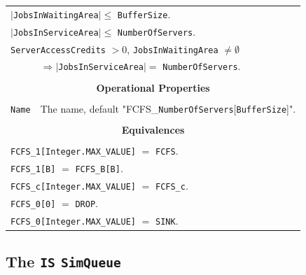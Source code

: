 \documentclass[12pt]{book}
\begin{document}
\begin{tabular}{|l|l|l|l|}
\multicolumn{4}{|l|}{$|$\lstinline|JobsInWaitingArea|$| \leq$ \lstinline|BufferSize|.} \\
\multicolumn{4}{|l|}{$|$\lstinline|JobsInServiceArea|$| \leq$ \lstinline|NumberOfServers|.} \\
\multicolumn{4}{|l|}{\lstinline|ServerAccessCredits| $> 0$, \lstinline|JobsInWaitingArea| $\neq \emptyset$} \\
    \multicolumn{1}{|l}{}
  & \multicolumn{3}{l|}{$\Rightarrow |$\lstinline|JobsInServiceArea|$| =$ \lstinline|NumberOfServers|.} \\
\hline
\multicolumn{4}{|c|}{} \\
\multicolumn{4}{|c|}{\bf Operational Properties} \\
\multicolumn{4}{|c|}{} \\
\hline
\lstinline|Name| & \multicolumn{3}{|l|}{The name, default "FCFS\_\lstinline{NumberOfServers}[\lstinline|BufferSize|]".} \\
\hline
\multicolumn{4}{|c|}{} \\
\multicolumn{4}{|c|}{\bf Equivalences} \\
\multicolumn{4}{|c|}{} \\
\hline
\multicolumn{4}{|l|}{\lstinline|FCFS_1[Integer.MAX_VALUE]| $=$ \lstinline|FCFS|.} \\
\multicolumn{4}{|l|}{\lstinline|FCFS_1[B]| $=$ \lstinline|FCFS_B[B]|.} \\
\multicolumn{4}{|l|}{\lstinline|FCFS_c[Integer.MAX_VALUE]| $=$ \lstinline|FCFS_c|.} \\
\multicolumn{4}{|l|}{\lstinline|FCFS_0[0]| $=$ \lstinline|DROP|.} \\
\multicolumn{4}{|l|}{\lstinline|FCFS_0[Integer.MAX_VALUE]| $=$ \lstinline|SINK|.} \\
\hline
\end{tabular}

\subsection{The \lstinline{IS} \lstinline{SimQueue}}
\label{sec:IS}
\end{document}

